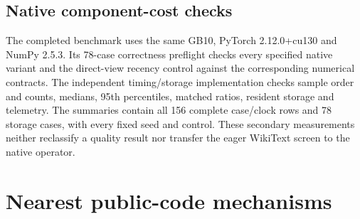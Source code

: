 \documentclass[11pt]{article}
\begin{document}
\subsection{Native component-cost checks}
\label{app:native-cost}

The completed benchmark uses the same GB10, PyTorch 2.12.0+cu130 and
NumPy 2.5.3. Its 78-case correctness preflight checks every specified native
variant and the direct-view recency control against the corresponding
numerical contracts. The independent timing/storage implementation checks
sample order and counts, medians, 95th percentiles, matched ratios,
resident storage and telemetry. The summaries contain all 156 complete
case/clock rows and 78 storage cases, with every fixed seed and control.
These secondary measurements neither reclassify a quality result nor
transfer the eager WikiText screen to the native operator.

\section{Nearest public-code mechanisms}
\label{app:public-code}
\end{document}
